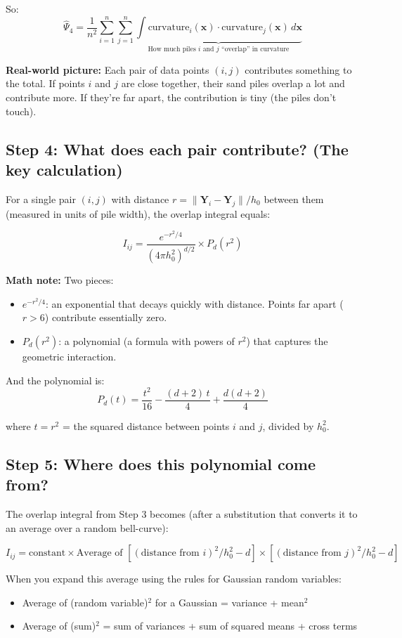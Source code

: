 \documentclass[12pt]{article}
\newcommand{\realworld}[1]{\begin{tcolorbox}[colback=green!5,colframe=green!50!black,breakable]\textbf{Real-world picture:} #1\end{tcolorbox}}
\newcommand{\mathnote}[1]{\begin{tcolorbox}[colback=yellow!5,colframe=yellow!60!black,breakable]\textbf{Math note:} #1\end{tcolorbox}}
\begin{document}
So:
$$\hat\Psi_4 = \frac{1}{n^2}\sum_{i=1}^n \sum_{j=1}^n \underbrace{\int \text{curvature}_i(\mathbf{x}) \cdot \text{curvature}_j(\mathbf{x})\, d\mathbf{x}}_{\text{How much piles }i\text{ and }j\text{ ``overlap'' in curvature}}$$

\realworld{
Each pair of data points $(i, j)$ contributes something to the total. If points $i$ and $j$ are close together, their sand piles overlap a lot and contribute more. If they're far apart, the contribution is tiny (the piles don't touch).
}

\subsection{Step 4: What does each pair contribute? (The key calculation)}

For a single pair $(i, j)$ with distance $r = \|\mathbf{Y}_i - \mathbf{Y}_j\| / h_0$ between them (measured in units of pile width), the overlap integral equals:

$$I_{ij} = \frac{e^{-r^2/4}}{(4\pi h_0^2)^{d/2}} \times P_d(r^2)$$

\mathnote{
Two pieces:
\begin{itemize}
\item $e^{-r^2/4}$: an exponential that decays quickly with distance. Points far apart ($r > 6$) contribute essentially zero.
\item $P_d(r^2)$: a polynomial (a formula with powers of $r^2$) that captures the geometric interaction.
\end{itemize}
}

And the polynomial is:
$$\boxed{P_d(t) = \frac{t^2}{16} - \frac{(d+2)\,t}{4} + \frac{d(d+2)}{4}}$$

where $t = r^2$ = the squared distance between points $i$ and $j$, divided by $h_0^2$.

\subsection{Step 5: Where does this polynomial come from?}

The overlap integral from Step 3 becomes (after a substitution that converts it to an average over a random bell-curve):

$$I_{ij} = \text{constant} \times \text{Average of } [(\text{distance from }i)^2/h_0^2 - d] \times [(\text{distance from }j)^2/h_0^2 - d]$$

When you expand this average using the rules for Gaussian random variables:
\begin{itemize}
\item Average of (random variable)$^2$ for a Gaussian = variance + mean$^2$
\item Average of (sum)$^2$ = sum of variances + sum of squared means + cross terms
\end{itemize}
\end{document}

